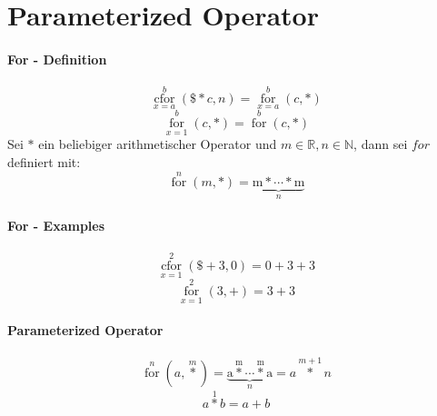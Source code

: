 \documentclass{article}
\begin{document}
\section{Parameterized Operator}
\paragraph{For - Definition}

\[ \operatorname*{cfor}_{x=a}^{b}\left(\$\ast c,n\right) = \operatorname*{for}_{x=a}^{b}\left(c,\ast \right) \]
\[ \operatorname*{for}_{x=1}^{b}\left(c, \ast\right) = \operatorname*{for}^{b}\left(c,\ast \right) \]
Sei $\ast$ ein beliebiger arithmetischer Operator und $m \in \mathbb{R}, n \in \mathbb{N}$, dann sei $for$ definiert mit:
\[ \operatorname*{for}^n \left(m, \ast \right) = \operatorname*{\underbrace{m \ast \dotsb \ast m}}_{n} \]

\paragraph{For - Examples}

\[ \operatorname*{cfor}_{x=1}^{2}\left(\$+3,0\right) = 0+3+3 \]
\[ \operatorname*{for}_{x=1}^{2}\left(3,+\right) = 3+3 \]

\paragraph{Parameterized Operator}
\[ \operatorname*{for}^{n}\left(a,\operatorname*{\ast}^m\right) = \operatorname*{\underbrace{a \operatorname*{\ast}^m \dotsb \operatorname*{\ast}^m a}}_n = a\operatorname*{\ast}^{m+1}n\]
\[ a \operatorname*{\ast}^1 b = a + b \]
\end{document}
